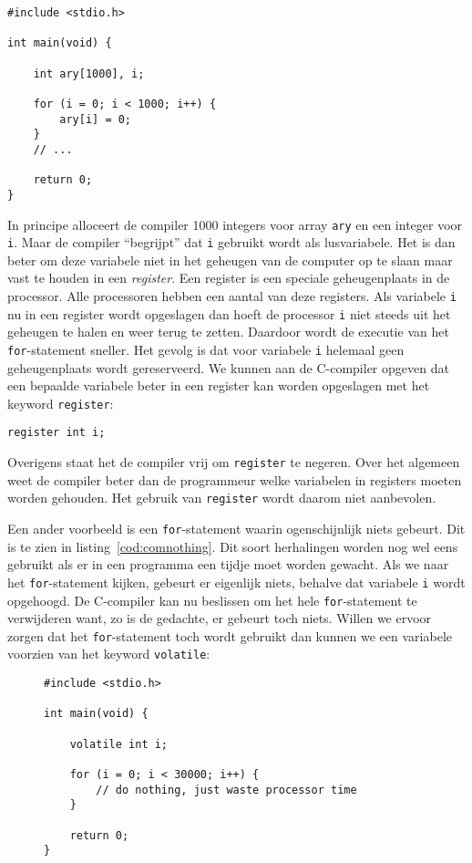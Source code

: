 \begin{lstlisting}[caption=Een C-programma.,label=cod:comclearary]
#include <stdio.h>

int main(void) {

    int ary[1000], i;
    
    for (i = 0; i < 1000; i++) {
        ary[i] = 0;
    }
    // ...
    
    return 0;
}
\end{lstlisting}

In principe alloceert de compiler 1000 integers voor array \texttt{ary} en een integer voor \texttt{i}. Maar de compiler ``begrijpt'' dat \texttt{i} gebruikt wordt als lusvariabele. Het is dan beter om deze variabele niet in het geheugen van de computer op te slaan maar vast te houden in een \textsl{register}. Een register is een speciale geheugenplaats in de processor. Alle processoren hebben een aantal van deze registers. Als variabele \texttt{i} nu in een register wordt opgeslagen dan hoeft de processor \texttt{i} niet steeds uit het geheugen te halen en weer terug te zetten. Daardoor wordt de executie van het \texttt{for}-statement sneller. Het gevolg is dat voor variabele \texttt{i} helemaal geen geheugenplaats wordt gereserveerd. We kunnen aan de C-compiler opgeven dat een bepaalde variabele beter in een register kan worden opgeslagen met het keyword \texttt{register}:

\hspace*{1em}\texttt{register int i;}

Overigens staat het de compiler vrij om \texttt{register} te negeren. Over het algemeen weet de compiler beter dan de programmeur welke variabelen in registers moeten worden gehouden. Het gebruik van \texttt{register} wordt daarom niet aanbevolen.

Een ander voorbeeld is een \texttt{for}-statement waarin ogenschijnlijk niets gebeurt. Dit is te zien in listing~\ref{cod:comnothing}.
Dit soort herhalingen worden nog wel eens gebruikt als er in een programma een tijdje moet worden gewacht. Als we naar het \texttt{for}-statement kijken, gebeurt er eigenlijk niets, behalve dat variabele \texttt{i} wordt opgehoogd. De C-compiler kan nu beslissen om het hele \texttt{for}-statement te verwijderen want, zo is de gedachte, er gebeurt toch niets. Willen we ervoor zorgen dat het \texttt{for}-statement toch wordt gebruikt dan kunnen we een variabele voorzien van het keyword \texttt{volatile}:

\begin{figure}[!ht]
\begin{lstlisting}[caption=Een C-programma.,label=cod:comnothing]
#include <stdio.h>

int main(void) {

    volatile int i;
    
    for (i = 0; i < 30000; i++) {
        // do nothing, just waste processor time
    }
    
    return 0;
}
\end{lstlisting}
\end{figure}

